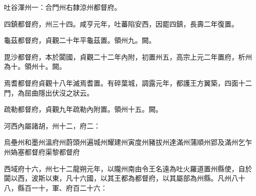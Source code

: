 \begin{pinyinscope}
 吐谷渾州一：合門州右隸涼州都督府。



 四鎮都督府，州三十四。咸亨元年，吐蕃陷安西，因罷四鎮，長壽二年復置。



 龜茲都督府，貞觀二十年平龜茲置。領州九。闕。



 毘沙都督府，本於闐國，貞觀二十二年內附，初置州五，高宗上元二年置府，析州為十。領州十。闕。



 焉耆都督府貞觀十八年滅焉耆置。有碎葉城，調露元年，都護王方翼築，四面十二門，為屈曲隱出伏沒之狀云。



 疏勒都督府，貞觀九年疏勒內附置。領州十五。闕。



 河西內屬諸胡，州十二，府二：



 烏壘州和墨州溫府州蔚頭州遍城州耀建州寅度州豬拔州達滿州蒲順州郢及滿州乞乍州媯塞都督府渠黎都督府



 西域府十六，州七十二龍朔元年，以隴州南由令王名遠為吐火羅道置州縣使，自於闐以西，波斯以東，凡十六國，以其王都為都督府，以其屬部為州縣。凡州八十八，縣百一十，軍、府百二十六：




\end{pinyinscope}
